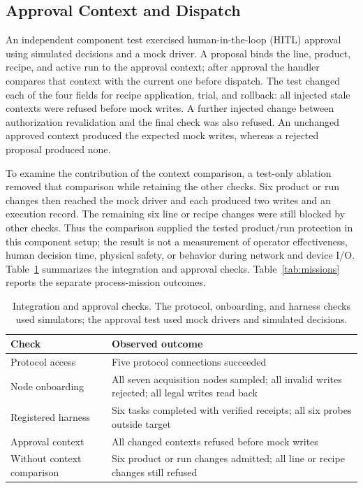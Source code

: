 \subsection{Approval Context and Dispatch}
An independent component test exercised human-in-the-loop (HITL) approval
using simulated decisions and a mock driver. A proposal binds the line,
product, recipe, and active run to the approval context; after approval the
handler compares that context with the current one before dispatch. The test
changed each of the four fields for recipe application, trial, and rollback:
all injected stale contexts were refused before mock writes. A further injected
change between authorization revalidation and the final check was also
refused. An unchanged approved context produced the expected mock writes,
whereas a rejected proposal produced none.

To examine the contribution of the context comparison, a test-only ablation
removed that comparison while retaining the other checks. Six product or run
changes then reached the mock driver and each produced two writes and an
execution record. The remaining six line or recipe changes were still blocked
by other checks. Thus the comparison supplied the tested product/run
protection in this component setup; the result is not a measurement of
operator effectiveness, human decision time, physical safety, or behavior
during network and device I/O.
Table~\ref{tab:integration-checks} summarizes the integration and approval
checks. Table~\ref{tab:missions} reports the separate process-mission outcomes.

\begin{table}[!t]
\centering
\caption{Integration and approval checks. The protocol, onboarding, and
harness checks used simulators; the approval test used mock drivers and
simulated decisions.}
\label{tab:integration-checks}
\footnotesize
\setlength{\tabcolsep}{3pt}
\begin{tabularx}{\columnwidth}{@{}>{\raggedright\arraybackslash}p{2.15cm}X@{}}
\toprule
Check & Observed outcome \\
\midrule
Protocol access & Five protocol connections succeeded \\
Node onboarding & All seven acquisition nodes sampled; all invalid writes rejected; all legal writes read back \\
Registered harness & Six tasks completed with verified receipts; all six probes outside target \\
Approval context & All changed contexts refused before mock writes \\
Without context comparison & Six product or run changes admitted; all line or recipe changes still refused \\
\bottomrule
\end{tabularx}
\end{table}

